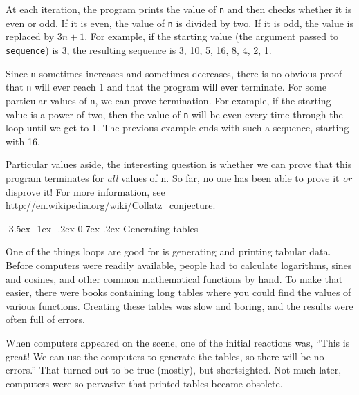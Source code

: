 \documentclass[12pt]{book}
\makeatletter
\theoremstyle{exercise}
\newcommand{\java}[1]{\verb"#1"}
\renewcommand{\section}{\@startsection {section}{1}{\z@}%
    {-3.5ex \@plus -1ex \@minus -.2ex}%
    {0.7ex \@plus.2ex}%
    {\normalfont\Large\bfseries}}
\newcommand{\java}[1]{\lstinline{#1}} %
\makeatother
\begin{document}

At each iteration, the program prints the value of \java{n} and then checks whether it is even or odd.
If it is even, the value of \java{n} is divided by two.
If it is odd, the value is replaced by $3n+1$.
For example, if the starting value (the argument passed to \java{sequence}) is 3, the resulting sequence is 3, 10, 5, 16, 8, 4, 2, 1.

Since \java{n} sometimes increases and sometimes decreases, there is no obvious proof that \java{n} will ever reach 1 and that the program will ever terminate.
For some particular values of \java{n}, we can prove termination.
For example, if the starting value is a power of two, then the value of \java{n} will be even every time through the loop until we get to 1.
The previous example ends with such a sequence, starting with 16.

Particular values aside, the interesting question is whether we can prove that this program terminates for {\em all} values of n.
So far, no one has been able to prove it {\em or} disprove it!
For more information, see \url{http://en.wikipedia.org/wiki/Collatz_conjecture}.


\section{Generating tables}


One of the things loops are good for is generating and printing tabular data.
Before computers were readily available, people had to calculate logarithms, sines and cosines, and other common mathematical functions by hand.
To make that easier, there were books containing long tables where you could find the values of various functions.
Creating these tables was slow and boring, and the results were often full of errors.

When computers appeared on the scene, one of the initial reactions was, ``This is great!
We can use the computers to generate the tables, so there will be no errors.''
That turned out to be true (mostly), but shortsighted.
Not much later, computers were so pervasive that printed tables became obsolete.
\end{document}
